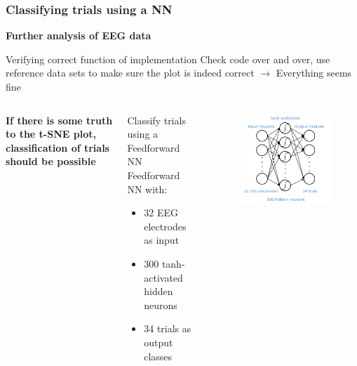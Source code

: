 \documentclass{beamer}
\begin{document}
\begin{frame}
	\frametitle{Classifying trials using a NN}
	\textbf{Further analysis of EEG data}
	\begin{block}{Verifying correct function of implementation}
		Check code over and over, use reference data sets to make sure the plot is indeed correct $\rightarrow$ Everything seems fine
	\end{block}
	
	\begin{columns}
		\textbf{If there is some truth to the t-SNE plot, classification of trials should be possible}
		\begin{block}{Classify trials using a Feedforward NN}
			Feedforward NN with:
			\begin{itemize}
				\item 32 EEG electrodes as input
				\item 300 tanh-activated hidden neurons
				\item 34 trials as output classes
			\end{itemize}
		\end{block}
		
		\begin{figure}[ht]
			\centering
			\includegraphics[width=1.0\textwidth, trim={0cm 0cm 0cm 0cm},clip]{images/FNN.pdf}
		\end{figure}	
	\end{columns}
\end{frame}
\end{document}
